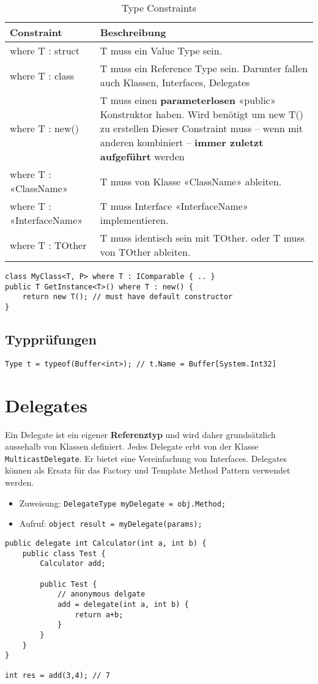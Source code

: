 \begin{table}[h]
	\centering
	\begin{tabu} to \linewidth {l X}
		\toprule 
		Constraint & Beschreibung \\
		\midrule
		where T : struct & T muss ein Value Type sein. \\
		where T : class & T muss ein Reference Type sein. Darunter fallen auch Klassen, Interfaces, Delegates \\
		where T : new() & T muss einen \textbf{parameterlosen} «public» Konstruktor haben. Wird benötigt um new T() zu erstellen
		Dieser Constraint muss – wenn mit anderen kombiniert – \textbf{immer zuletzt 
		aufgeführt} werden  \\
		where T : «ClassName» & T muss von Klasse «ClassName» ableiten. \\
		where T : «InterfaceName» & T muss Interface «InterfaceName» implementieren. \\
		where T : TOther & T muss identisch sein mit TOther.
		oder
		T muss von TOther ableiten.  \\
		\bottomrule
	\end{tabu} 
	\caption{Type Constraints}
\end{table}
\begin{lstlisting}
class MyClass<T, P> where T : IComparable { .. }
public T GetInstance<T>() where T : new() {
	return new T(); // must have default constructor
}
\end{lstlisting}

\subsection{Typprüfungen}
\begin{lstlisting}
Type t = typeof(Buffer<int>); // t.Name = Buffer[System.Int32]
\end{lstlisting}


\section{Delegates}
Ein Delegate ist ein eigener \textbf{Referenztyp} und wird daher grundsätzlich aussehalb von Klassen definiert. Jedes Delegate erbt von der Klasse \lstinline|MulticastDelegate|. Er bietet eine Vereinfachung von Interfaces. Delegates können als Ersatz für das Factory und Template Method Pattern verwendet werden. 
\begin{itemize}
	\item Zuweisung: \lstinline|DelegateType myDelegate = obj.Method;|
	\item Aufruf: \lstinline|object result = myDelegate(params);|
\end{itemize}
\begin{lstlisting}
public delegate int Calculator(int a, int b) {
	public class Test {
		Calculator add;
		
		public Test {
			// anonymous delgate
			add = delegate(int a, int b) {
				return a+b;
			}
		}
	}
}

int res = add(3,4); // 7
\end{lstlisting}

